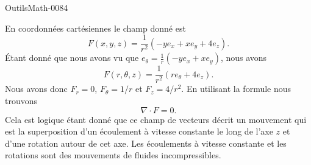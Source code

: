 
\begin{corrige}{OutilsMath-0084}

    En coordonnées cartésiennes le champ donné est
    \begin{equation}
        F(x,y,z)=\frac{1}{ r^2 }(-ye_x+xe_y+4e_z).
    \end{equation}
    Étant donné que nous avons vu que $e_{\theta}=\frac{1}{ r }(-ye_x+xe_y)$, nous avons
    \begin{equation}
        F(r,\theta,z)=\frac{1}{ r^2 }(re_{\theta}+4e_z).
    \end{equation}
    Nous avons donc $F_r=0$, $F_{\theta}=1/r$ et $F_z=4/r^2$. En utilisant la formule nous trouvons
    \begin{equation}
        \nabla\cdot F=0.
    \end{equation}
    Cela est logique étant donné que ce champ de vecteurs décrit un mouvement qui est la superposition d'un écoulement à vitesse constante le long de l'axe $z$ et d'une rotation autour de cet axe. Les écoulements à vitesse constante et les rotations sont des mouvements de fluides incompressibles.

\end{corrige}
